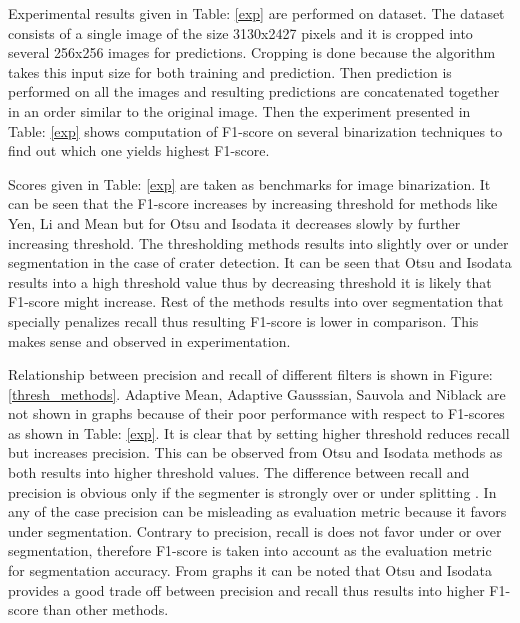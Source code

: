 \documentclass[11pt]{article}
\begin{document}
Experimental results given in Table: \ref{exp} are performed on \cite{dino2020} dataset. The dataset consists of a single image of the size 3130x2427 pixels and it is cropped into several 256x256 images for predictions. Cropping is done because the algorithm takes this input size for both training and prediction. Then prediction is performed on all the images and resulting predictions are concatenated together in an order similar to the original image. Then the experiment presented in Table: \ref{exp} shows computation of F1-score on several binarization techniques to find out which one yields highest F1-score.

Scores given in Table: \ref{exp} are taken as benchmarks for image binarization. It can be seen that the F1-score increases by increasing threshold for methods like Yen, Li and Mean but for Otsu and Isodata it decreases slowly by further increasing threshold. The thresholding methods results into slightly over or under segmentation in the case of crater detection. It can be seen that Otsu and Isodata results into a high threshold value thus by decreasing threshold it is likely that F1-score might increase. Rest of the methods results into over segmentation that specially penalizes recall thus resulting F1-score is lower in comparison. This makes sense and observed in experimentation.

Relationship between precision and recall of different filters is shown in Figure: \ref{thresh_methods}. Adaptive Mean, Adaptive Gausssian, Sauvola and Niblack are not shown in graphs because of their poor performance with respect to F1-scores as shown in Table: \ref{exp}. It is clear that by setting higher threshold reduces recall but increases precision. This can be observed from Otsu and Isodata methods as both results into higher threshold values. The difference between recall and  precision is obvious only if the segmenter is strongly over or under splitting \cite{badrinarayanan2017segnet}. In any of the case precision can be misleading as evaluation metric because it favors under segmentation. Contrary to precision, recall is does not favor under or over segmentation, therefore F1-score is taken into account as the evaluation metric for segmentation accuracy. From graphs it can be noted that Otsu and Isodata provides a good trade off between precision and recall thus results into higher F1-score than other methods.
 
\end{document}
